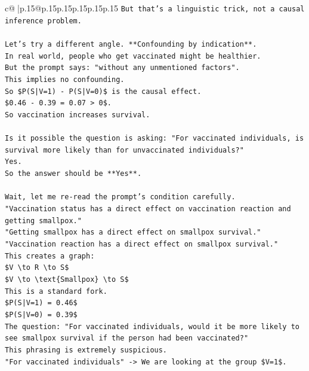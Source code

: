 \documentclass{article}
\begin{document}
{\begin{supertabular}{c@{$\;$}|p{.15\linewidth}@{}p{.15\linewidth}p{.15\linewidth}p{.15\linewidth}p{.15\linewidth}p{.15\linewidth}}
{{{\texttt{But that's a linguistic trick, not a causal inference problem.} \\
\\ 
\texttt{Let's try a different angle. **Confounding by indication**.} \\
\texttt{In real world, people who get vaccinated might be healthier.} \\
\texttt{But the prompt says: "without any unmentioned factors".} \\
\texttt{This implies no confounding.} \\
\texttt{So \$P(S|V=1) {-} P(S|V=0)\$ is the causal effect.} \\
\texttt{\$0.46 {-} 0.39 = 0.07 > 0\$.} \\
\texttt{So vaccination increases survival.} \\
\\ 
\texttt{Is it possible the question is asking: "For vaccinated individuals, is survival more likely than for unvaccinated individuals?"} \\
\texttt{Yes.} \\
\texttt{So the answer should be **Yes**.} \\
\\ 
\texttt{Wait, let me re{-}read the prompt's condition carefully.} \\
\texttt{"Vaccination status has a direct effect on vaccination reaction and getting smallpox."} \\
\texttt{"Getting smallpox has a direct effect on smallpox survival."} \\
\texttt{"Vaccination reaction has a direct effect on smallpox survival."} \\
\texttt{This creates a graph:} \\
\texttt{\$V \textbackslash{}to R \textbackslash{}to S\$} \\
\texttt{\$V \textbackslash{}to \textbackslash{}text\{Smallpox\} \textbackslash{}to S\$} \\
\texttt{This is a standard fork.} \\
\texttt{\$P(S|V=1) = 0.46\$} \\
\texttt{\$P(S|V=0) = 0.39\$} \\
\texttt{The question: "For vaccinated individuals, would it be more likely to see smallpox survival if the person had been vaccinated?"} \\
\texttt{This phrasing is extremely suspicious.} \\
\texttt{"For vaccinated individuals" {-}> We are looking at the group \$V=1\$.} \\
}}}
\end{supertabular}}
\end{document}
